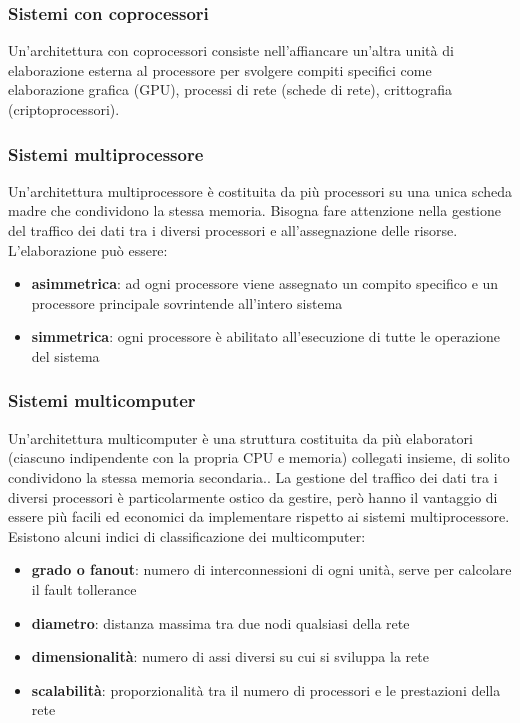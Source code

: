 \documentclass[a4paper]{article}
\begin{document}
\subsubsection*{Sistemi con coprocessori}
Un'architettura con coprocessori consiste nell'affiancare un'altra unità di elaborazione esterna al processore per svolgere compiti
specifici come elaborazione grafica (GPU), processi di rete (schede di rete), crittografia (criptoprocessori).

\subsubsection*{Sistemi multiprocessore}
Un'architettura multiprocessore è costituita da più processori su una unica scheda madre che condividono la stessa memoria.
Bisogna fare attenzione nella gestione del traffico dei dati tra i diversi processori e all'assegnazione delle risorse.
L'elaborazione può essere:
\begin{itemize}
	\item \textbf{asimmetrica}: ad ogni processore viene assegnato un compito specifico e un processore principale sovrintende
	all’intero sistema
	\item \textbf{simmetrica}: ogni processore è abilitato all’esecuzione di tutte le operazione del sistema
\end{itemize}

\subsubsection*{Sistemi multicomputer}
Un'architettura multicomputer è una struttura costituita da più elaboratori (ciascuno indipendente con la propria CPU e memoria)
collegati insieme, di solito condividono la stessa memoria secondaria.. La gestione del traffico dei dati tra i diversi processori
è particolarmente ostico da gestire, però hanno il vantaggio di essere più facili ed economici da implementare rispetto ai sistemi
multiprocessore. Esistono alcuni indici di classificazione dei multicomputer:
\begin{itemize}
	\item \textbf{grado o fanout}: numero di interconnessioni di ogni unità, serve per calcolare il fault tollerance
	\item \textbf{diametro}: distanza massima tra due nodi qualsiasi della rete
	\item \textbf{dimensionalità}: numero di assi diversi su cui si sviluppa la rete
	\item \textbf{scalabilità}: proporzionalità tra il numero di processori e le prestazioni della rete
\end{itemize}
\end{document}

